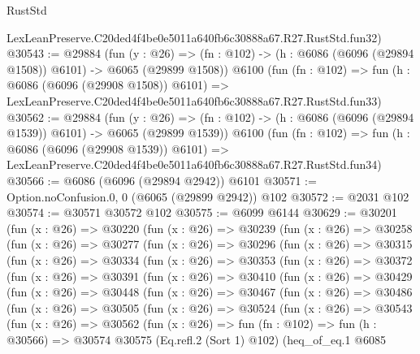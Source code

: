 \begin{lexlean}{RustStd}
\begin{coremodule}
    LexLeanPreserve.C20ded4f4be0e5011a640fb6c30888a67.R27.RustStd.fun32)
@30543 := @29884
    (fun (y : @26) =>
    (fn : @102) -> (h : @6086 (@6096 (@29894 @1508)) @6101) -> @6065 (@29899 @1508))
    @6100
    (fun (fn : @102) =>
    fun (h : @6086 (@6096 (@29908 @1508)) @6101) =>
    LexLeanPreserve.C20ded4f4be0e5011a640fb6c30888a67.R27.RustStd.fun33)
@30562 := @29884
    (fun (y : @26) =>
    (fn : @102) -> (h : @6086 (@6096 (@29894 @1539)) @6101) -> @6065 (@29899 @1539))
    @6100
    (fun (fn : @102) =>
    fun (h : @6086 (@6096 (@29908 @1539)) @6101) =>
    LexLeanPreserve.C20ded4f4be0e5011a640fb6c30888a67.R27.RustStd.fun34)
@30566 := @6086 (@6096 (@29894 @2942)) @6101
@30571 := Option.noConfusion.{0, 0} (@6065 (@29899 @2942)) @102
@30572 := @2031 @102
@30574 := @30571 @30572 @102
@30575 := @6099 @6144
@30629 := @30201
    (fun (x : @26) =>
    @30220
      (fun (x : @26) =>
      @30239
        (fun (x : @26) =>
        @30258
          (fun (x : @26) =>
          @30277
            (fun (x : @26) =>
            @30296
              (fun (x : @26) =>
              @30315
                (fun (x : @26) =>
                @30334
                  (fun (x : @26) =>
                  @30353
                    (fun (x : @26) =>
                    @30372
                      (fun (x : @26) =>
                      @30391
                        (fun (x : @26) =>
                        @30410
                          (fun (x : @26) =>
                          @30429
                            (fun (x : @26) =>
                            @30448
                              (fun (x : @26) =>
                              @30467
                                (fun (x : @26) =>
                                @30486
                                  (fun (x : @26) =>
                                  @30505
                                    (fun (x : @26) =>
                                    @30524
                                      (fun (x : @26) =>
                                      @30543
                                        (fun (x : @26) =>
                                        @30562
                                          (fun (x : @26) =>
                                          fun (fn : @102) =>
                                          fun (h : @30566) =>
                                          @30574
                                            @30575
                                            (Eq.refl.{2} (Sort 1) @102)
                                            (heq_of_eq.{1}
                                              @6085

\end{coremodule}
\end{lexlean}
